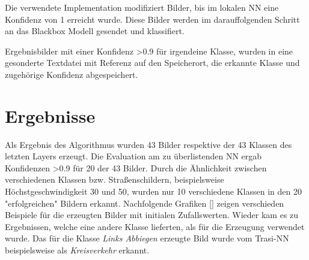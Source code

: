 Die verwendete Implementation modifiziert Bilder, bis im lokalen NN eine Konfidenz von 1 erreicht wurde. Diese Bilder werden im darauffolgenden Schritt an das Blackbox Modell gesendet und klassifiert. 

Ergebnisbilder mit einer Konfidenz >0.9 für irgendeine Klasse, wurden in eine gesonderte Textdatei mit Referenz auf den Speicherort, die erkannte Klasse und zugehörige Konfidenz abgespeichert.

%
%

\section{Ergebnisse}
Als Ergebnis des Algorithmus wurden 43 Bilder respektive der 43 Klassen des letzten Layers erzeugt. Die Evaluation am zu überlistenden NN ergab Konfidenzen >0.9 für 20 der 43 Bilder. Durch die Ähnlichkeit zwischen verschiedenen Klassen bzw. Straßenschildern, beispielsweise Höchstgeschwindigkeit 30 und 50, wurden nur 10 verschiedene Klassen in den 20 "erfolgreichen" Bildern erkannt.
Nachfolgende Grafiken [] zeigen verschieden Beispiele für die erzeugten Bilder mit initialen Zufallswerten. Wieder kam es zu Ergebnissen, welche eine andere Klasse lieferten, als für die Erzeugung verwendet wurde. Das für die Klasse \textit{Links Abbiegen} erzeugte Bild wurde vom Trasi-NN beispielsweise als \textit{Kreisverkehr} erkannt.


